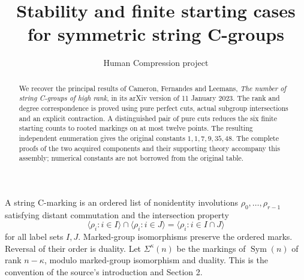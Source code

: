\documentclass[11pt,a4paper]{article}
\title{Stability and finite starting cases for symmetric string C-groups}
\author{Human Compression project}\date{}
\newcommand{\Sym}{\operatorname{Sym}}
\begin{document}
\maketitle
\begin{abstract}
We recover the principal results of Cameron, Fernandes and Leemans,
\emph{The number of string C-groups of high rank}, in its arXiv version
of 11 January 2023. The rank and degree correspondence is proved using
pure perfect cuts, actual subgroup intersections and an explicit
contraction. A distinguished pair of pure cuts reduces the six finite
starting counts to rooted markings on at most twelve points. The
resulting independent enumeration gives the original constants
$1,1,7,9,35,48$. The complete proofs of the two acquired components and
their supporting theory accompany this assembly; numerical constants
are not borrowed from the original table.
\end{abstract}

A string C-marking is an ordered list of nonidentity involutions
$\rho_0,\ldots,\rho_{r-1}$ satisfying distant commutation and the
intersection property
\[
 \langle\rho_i:i\in I\rangle\cap\langle\rho_i:i\in J\rangle
       =\langle\rho_i:i\in I\cap J\rangle
\]
for all label sets $I,J$. Marked-group isomorphisms preserve the ordered
marks. Reversal of their order is duality. Let $\Sigma^\kappa(n)$
be the markings of $\Sym(n)$ of rank $n-\kappa$, modulo marked-group
isomorphism and duality. This is the convention of the source's
introduction and Section 2.
\end{document}

